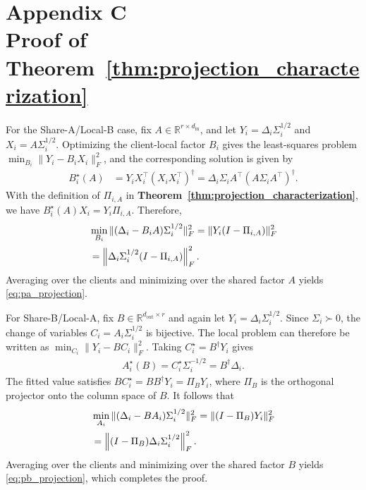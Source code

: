 \documentclass[lettersize,journal]{IEEEtran}
\begin{document}
	\section*{Appendix C \\ Proof of Theorem~\ref{thm:projection_characterization}}
	\label{app:proof_projection_characterization}
	
	
	
	For the Share-A/Local-B case, fix $A\in\mathbb{R}^{r\times d_{\mathrm{in}}}$, and let
	$Y_i=\Delta_i\Sigma_i^{1/2}$ and
	$X_i=A\Sigma_i^{1/2}$. Optimizing the client-local factor $B_i$ gives the least-squares problem
	$\min_{B_i}\|Y_i-B_iX_i\|_F^2$, and the corresponding solution is given by
	\begin{align}
		B_i^\star(A)
		&=
		Y_iX_i^\top
		(X_iX_i^\top)^\dagger
		=\Delta_i\Sigma_iA^\top
		(A\Sigma_iA^\top)^\dagger.
		\label{eq:bi_star_given_a}
	\end{align}
	With the definition of $\Pi_{i,A}$ in \textbf{Theorem~\ref{thm:projection_characterization}}, we have
	$B_i^\star(A)X_i=Y_i\Pi_{i,A}$. Therefore,
	\begin{align}
		&\min_{B_i}
		\|(\Delta_i-B_iA)\Sigma_i^{1/2}\|_F^2
		=
		\|Y_i(I-\Pi_{i,A})\|_F^2
		\notag\\
		&=
		\left\|
		\Delta_i\Sigma_i^{1/2}
		(I-\Pi_{i,A})
		\right\|_F^2.
	\end{align}
	Averaging over the clients and minimizing over the shared factor $A$ yields \eqref{eq:pa_projection}.
	
	
	For Share-B/Local-A, fix $B\in\mathbb{R}^{d_{\mathrm{out}}\times r}$ and again let
	$Y_i=\Delta_i\Sigma_i^{1/2}$. Since $\Sigma_i\succ0$, the change of variables $C_i=A_i\Sigma_i^{1/2}$ is bijective. The local problem can therefore be written as
	$\min_{C_i}\|Y_i-BC_i\|_F^2$. Taking
	$C_i^\star=B^\dagger Y_i$ gives
	\begin{align}
		A_i^\star(B)
		=
		C_i^\star\Sigma_i^{-1/2}
		=
		B^\dagger\Delta_i.
		\label{eq:ai_star_given_b}
	\end{align}
	The fitted value satisfies
	$BC_i^\star=BB^\dagger Y_i=\Pi_BY_i$, where $\Pi_B$ is the orthogonal projector onto the column space of $B$. It follows that
	\begin{align}
		&\min_{A_i}
		\|(\Delta_i-BA_i)\Sigma_i^{1/2}\|_F^2
		=
		\|(I-\Pi_B)Y_i\|_F^2
		\notag\\
		&=
		\left\|
		(I-\Pi_B)
		\Delta_i\Sigma_i^{1/2}
		\right\|_F^2.
	\end{align}
	Averaging over the clients and minimizing over the shared factor $B$ yields \eqref{eq:pb_projection}, which completes the proof.
	
\end{document}
